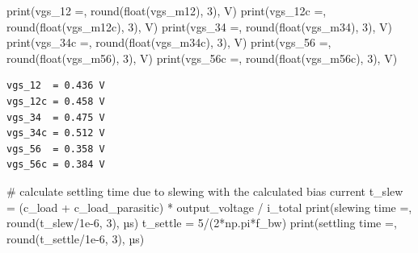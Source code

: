 \documentclass[
  a4paper,
  DIV=11,
  numbers=noendperiod]{scrartcl}
\newenvironment{Shaded}{\begin{snugshade}}{\end{snugshade}}
\newcommand{\BuiltInTok}[1]{\textcolor[rgb]{0.00,0.23,0.31}{#1}}
\newcommand{\CommentTok}[1]{\textcolor[rgb]{0.37,0.37,0.37}{#1}}
\newcommand{\DecValTok}[1]{\textcolor[rgb]{0.68,0.00,0.00}{#1}}
\newcommand{\FloatTok}[1]{\textcolor[rgb]{0.68,0.00,0.00}{#1}}
\newcommand{\NormalTok}[1]{\textcolor[rgb]{0.00,0.23,0.31}{#1}}
\newcommand{\OperatorTok}[1]{\textcolor[rgb]{0.37,0.37,0.37}{#1}}
\newcommand{\StringTok}[1]{\textcolor[rgb]{0.13,0.47,0.30}{#1}}
\begin{document}
\begin{tcolorbox}
\begin{Shaded}
\begin{Highlighting}[]
\BuiltInTok{print}\NormalTok{(}\StringTok{\textquotesingle{}vgs\_12  =\textquotesingle{}}\NormalTok{, }\BuiltInTok{round}\NormalTok{(}\BuiltInTok{float}\NormalTok{(vgs\_m12), }\DecValTok{3}\NormalTok{), }\StringTok{\textquotesingle{}V\textquotesingle{}}\NormalTok{)}
\BuiltInTok{print}\NormalTok{(}\StringTok{\textquotesingle{}vgs\_12c =\textquotesingle{}}\NormalTok{, }\BuiltInTok{round}\NormalTok{(}\BuiltInTok{float}\NormalTok{(vgs\_m12c), }\DecValTok{3}\NormalTok{), }\StringTok{\textquotesingle{}V\textquotesingle{}}\NormalTok{)}
\BuiltInTok{print}\NormalTok{(}\StringTok{\textquotesingle{}vgs\_34  =\textquotesingle{}}\NormalTok{, }\BuiltInTok{round}\NormalTok{(}\BuiltInTok{float}\NormalTok{(vgs\_m34), }\DecValTok{3}\NormalTok{), }\StringTok{\textquotesingle{}V\textquotesingle{}}\NormalTok{)}
\BuiltInTok{print}\NormalTok{(}\StringTok{\textquotesingle{}vgs\_34c =\textquotesingle{}}\NormalTok{, }\BuiltInTok{round}\NormalTok{(}\BuiltInTok{float}\NormalTok{(vgs\_m34c), }\DecValTok{3}\NormalTok{), }\StringTok{\textquotesingle{}V\textquotesingle{}}\NormalTok{)}
\BuiltInTok{print}\NormalTok{(}\StringTok{\textquotesingle{}vgs\_56  =\textquotesingle{}}\NormalTok{, }\BuiltInTok{round}\NormalTok{(}\BuiltInTok{float}\NormalTok{(vgs\_m56), }\DecValTok{3}\NormalTok{), }\StringTok{\textquotesingle{}V\textquotesingle{}}\NormalTok{)}
\BuiltInTok{print}\NormalTok{(}\StringTok{\textquotesingle{}vgs\_56c =\textquotesingle{}}\NormalTok{, }\BuiltInTok{round}\NormalTok{(}\BuiltInTok{float}\NormalTok{(vgs\_m56c), }\DecValTok{3}\NormalTok{), }\StringTok{\textquotesingle{}V\textquotesingle{}}\NormalTok{)}
\end{Highlighting}
\end{Shaded}

\begin{verbatim}
vgs_12  = 0.436 V
vgs_12c = 0.458 V
vgs_34  = 0.475 V
vgs_34c = 0.512 V
vgs_56  = 0.358 V
vgs_56c = 0.384 V
\end{verbatim}

\begin{Shaded}
\begin{Highlighting}[]
\CommentTok{\# calculate settling time due to slewing with the calculated bias current}
\NormalTok{t\_slew }\OperatorTok{=}\NormalTok{ (c\_load }\OperatorTok{+}\NormalTok{ c\_load\_parasitic) }\OperatorTok{*}\NormalTok{ output\_voltage }\OperatorTok{/}\NormalTok{ i\_total}
\BuiltInTok{print}\NormalTok{(}\StringTok{\textquotesingle{}slewing time  =\textquotesingle{}}\NormalTok{, }\BuiltInTok{round}\NormalTok{(t\_slew}\OperatorTok{/}\FloatTok{1e{-}6}\NormalTok{, }\DecValTok{3}\NormalTok{), }\StringTok{\textquotesingle{}µs\textquotesingle{}}\NormalTok{)}
\NormalTok{t\_settle }\OperatorTok{=} \DecValTok{5}\OperatorTok{/}\NormalTok{(}\DecValTok{2}\OperatorTok{*}\NormalTok{np.pi}\OperatorTok{*}\NormalTok{f\_bw)}
\BuiltInTok{print}\NormalTok{(}\StringTok{\textquotesingle{}settling time =\textquotesingle{}}\NormalTok{, }\BuiltInTok{round}\NormalTok{(t\_settle}\OperatorTok{/}\FloatTok{1e{-}6}\NormalTok{, }\DecValTok{3}\NormalTok{), }\StringTok{\textquotesingle{}µs\textquotesingle{}}\NormalTok{)}
\end{Highlighting}
\end{Shaded}


\end{tcolorbox}
\end{document}
